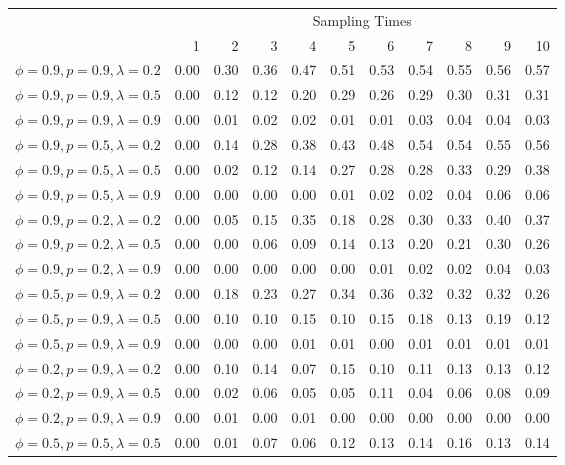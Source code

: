 \documentclass[]{article}
\begin{document}
\begin{table}[ht]
\begin{tabular}{rrrrrrrrrrr}
  \hline
& \multicolumn{10}{c}{Sampling Times}\\
 & 1 & 2 & 3 & 4 & 5 & 6 & 7 & 8 & 9 & 10 \\ 
  \hline
  $\phi=0.9, p=0.9, \lambda=0.2$ & 0.00 & 0.30 & 0.36 & 0.47 & 0.51 & 0.53 & 0.54 & 0.55 & 0.56 & 0.57 \\ 
  $\phi=0.9, p=0.9, \lambda=0.5$ & 0.00 & 0.12 & 0.12 & 0.20 & 0.29 & 0.26 & 0.29 & 0.30 & 0.31 & 0.31 \\ 
  $\phi=0.9, p=0.9, \lambda=0.9$ & 0.00 & 0.01 & 0.02 & 0.02 & 0.01 & 0.01 & 0.03 & 0.04 & 0.04 & 0.03 \\ \hline
  $\phi=0.9, p=0.5, \lambda=0.2$ & 0.00 & 0.14 & 0.28 & 0.38 & 0.43 & 0.48 & 0.54 & 0.54 & 0.55 & 0.56 \\ 
  $\phi=0.9, p=0.5, \lambda=0.5$ & 0.00 & 0.02 & 0.12 & 0.14 & 0.27 & 0.28 & 0.28 & 0.33 & 0.29 & 0.38 \\ 
  $\phi=0.9, p=0.5, \lambda=0.9$ & 0.00 & 0.00 & 0.00 & 0.00 & 0.01 & 0.02 & 0.02 & 0.04 & 0.06 & 0.06 \\ \hline
  $\phi=0.9, p=0.2, \lambda=0.2$ & 0.00 & 0.05 & 0.15 & 0.35 & 0.18 & 0.28 & 0.30 & 0.33 & 0.40 & 0.37 \\ 
  $\phi=0.9, p=0.2, \lambda=0.5$ & 0.00 & 0.00 & 0.06 & 0.09 & 0.14 & 0.13 & 0.20 & 0.21 & 0.30 & 0.26 \\ 
  $\phi=0.9, p=0.2, \lambda=0.9$ & 0.00 & 0.00 & 0.00 & 0.00 & 0.00 & 0.01 & 0.02 & 0.02 & 0.04 & 0.03 \\ \hline
  $\phi=0.5, p=0.9, \lambda=0.2$ & 0.00 & 0.18 & 0.23 & 0.27 & 0.34 & 0.36 & 0.32 & 0.32 & 0.32 & 0.26 \\ 
  $\phi=0.5, p=0.9, \lambda=0.5$ & 0.00 & 0.10 & 0.10 & 0.15 & 0.10 & 0.15 & 0.18 & 0.13 & 0.19 & 0.12 \\ 
  $\phi=0.5, p=0.9, \lambda=0.9$ & 0.00 & 0.00 & 0.00 & 0.01 & 0.01 & 0.00 & 0.01 & 0.01 & 0.01 & 0.01 \\ \hline
  $\phi=0.2, p=0.9, \lambda=0.2$ & 0.00 & 0.10 & 0.14 & 0.07 & 0.15 & 0.10 & 0.11 & 0.13 & 0.13 & 0.12 \\ 
  $\phi=0.2, p=0.9, \lambda=0.5$ & 0.00 & 0.02 & 0.06 & 0.05 & 0.05 & 0.11 & 0.04 & 0.06 & 0.08 & 0.09 \\ 
  $\phi=0.2, p=0.9, \lambda=0.9$ & 0.00 & 0.01 & 0.00 & 0.01 & 0.00 & 0.00 & 0.00 & 0.00 & 0.00 & 0.00 \\ \hline
    $\phi=0.5, p=0.5, \lambda=0.5$ & 0.00 & 0.01 & 0.07 & 0.06 & 0.12 & 0.13 & 0.14 & 0.16 & 0.13 & 0.14 \\ \hline
\end{tabular}
\end{table}
\end{document}
